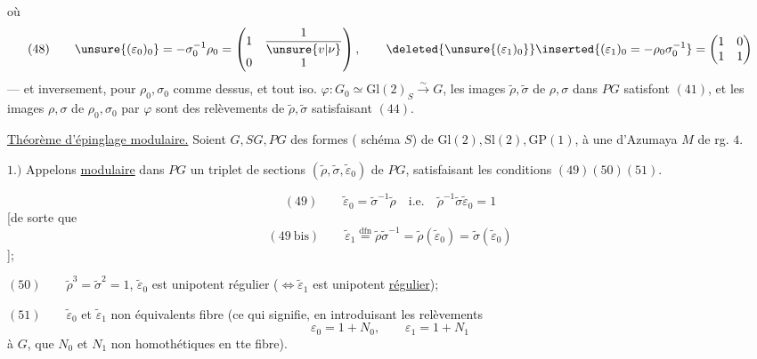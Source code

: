 

où 
\[
(48)\qquad
\unsure{(\varepsilon_0)_0}=-\sigma_0^{-1}\rho_0=
\begin{pmatrix}1&\dfrac{1}{\unsure{v|\nu}}\\0&1\end{pmatrix},\qquad
\deleted{\unsure{(\varepsilon_1)_0}}
\inserted{(\varepsilon_1)_0=-\rho_0\sigma_0^{-1}}=
\begin{pmatrix}1&0\\1&1\end{pmatrix}
\]
--- et inversement, pour $\rho_0,\sigma_0$ comme dessus, et tout iso.
$\varphi:G_0\simeq\mathrm{Gl}(2)_S\xrightarrow{\sim}G$, les images
$\widetilde\rho,\widetilde\sigma$ de $\rho,\sigma$ dans $PG$ satisfont
$(41)$, et les images $\rho,\sigma$ de $\rho_0,\sigma_0$ par $\varphi$
sont des relèvements de $\widetilde\rho,\widetilde\sigma$ satisfaisant $(44)$.

\uline{Théorème d'épinglage modulaire.} Soient $G,SG,PG$ des formes
( schéma $S$) de $\mathrm{Gl}(2),\mathrm{Sl}(2),\mathrm{GP}(1)$,
 à une  d'Azumaya $M$ de rg. $4$.

$1.)$ Appelons \uline{ modulaire}
dans $PG$ un triplet de sections $(\widetilde\rho,\widetilde\sigma,
\widetilde\varepsilon_0)$ de $PG$, satisfaisant les conditions $(49)(50)(51)$.


\[
(49)\qquad \widetilde\varepsilon_0=\widetilde\sigma^{-1}\widetilde\rho
\quad\text{i.e.}\quad
\widetilde\rho^{-1}\widetilde\sigma\widetilde\varepsilon_0=1
\]
[de sorte que
\[
(49\ \mathrm{bis})\qquad
\widetilde\varepsilon_1\overset{\mathrm{dfn}}=
\widetilde\rho\widetilde\sigma^{-1}=
\widetilde\rho(\widetilde\varepsilon_0)=
\widetilde\sigma(\widetilde\varepsilon_0)
\]
];

$(50)\qquad \widetilde\rho^3=\widetilde\sigma^2=1$,\quad
$\widetilde\varepsilon_0$ est unipotent régulier
($\Longleftrightarrow\widetilde\varepsilon_1$ est unipotent \uline{régulier});

$(51)\qquad \widetilde\varepsilon_0$ et $\widetilde\varepsilon_1$
 non équivalents 
 fibre
(ce qui signifie, en introduisant les relèvements
\[
\varepsilon_0=1+N_0,\qquad \varepsilon_1=1+N_1
\]
à $G$, que $N_0$ et $N_1$ non homothétiques en tte fibre).

